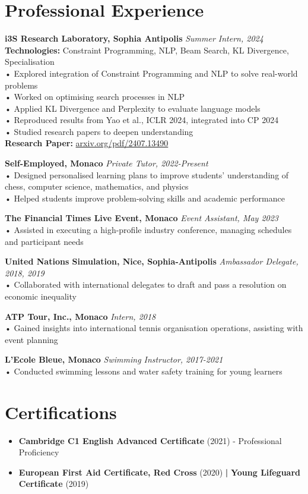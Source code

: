 \documentclass[a4paper,10pt]{article}
\begin{document}
\section*{Professional Experience}
\textbf{i3S Research Laboratory, Sophia Antipolis} \hfill \textit{Summer Intern, 2024}\\
\textbf{Technologies:} Constraint Programming, NLP, Beam Search, KL Divergence, Specialisation\\
• Explored integration of Constraint Programming and NLP to solve real-world problems\\
• Worked on optimising search processes in NLP\\
• Applied KL Divergence and Perplexity to evaluate language models\\
• Reproduced results from Yao et al., ICLR 2024, integrated into CP 2024\\
• Studied research papers to deepen understanding\\
\textbf{Research Paper:} \href{https://arxiv.org/pdf/2407.13490}{arxiv.org/pdf/2407.13490}

\textbf{Self-Employed, Monaco} \hfill \textit{Private Tutor, 2022-Present}\\
• Designed personalised learning plans to improve students' understanding of chess, computer science, mathematics, and physics\\
• Helped students improve problem-solving skills and academic performance

\textbf{The Financial Times Live Event, Monaco} \hfill \textit{Event Assistant, May 2023}\\
• Assisted in executing a high-profile industry conference, managing schedules and participant needs

\textbf{United Nations Simulation, Nice, Sophia-Antipolis} \hfill \textit{Ambassador Delegate, 2018, 2019}\\
• Collaborated with international delegates to draft and pass a resolution on economic inequality

\textbf{ATP Tour, Inc., Monaco} \hfill \textit{Intern, 2018}\\
• Gained insights into international tennis organisation operations, assisting with event planning

\textbf{L'Ecole Bleue, Monaco} \hfill \textit{Swimming Instructor, 2017-2021}\\
• Conducted swimming lessons and water safety training for young learners

\section*{Certifications}
\begin{itemize}
    \item \textbf{Cambridge C1 English Advanced Certificate} (2021) - Professional Proficiency
    \item \textbf{European First Aid Certificate, Red Cross} (2020) \textbf{|} \textbf{Young Lifeguard Certificate} (2019)
\end{itemize}
\end{document}
